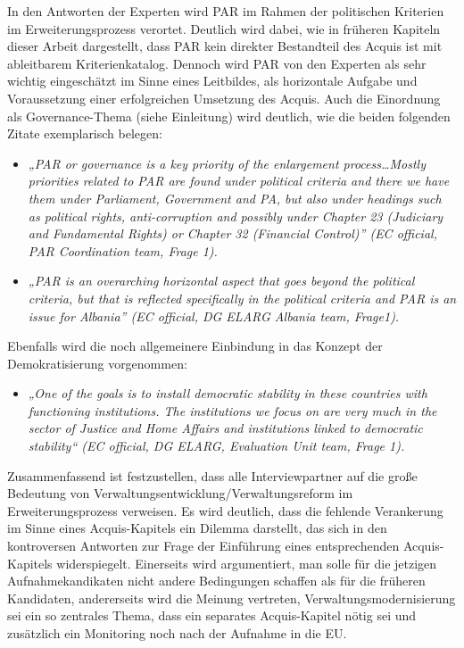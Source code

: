 In den Antworten der Experten wird PAR im Rahmen der politischen Kriterien im Erweiterungsprozess verortet. Deutlich wird dabei, wie in früheren Kapiteln dieser Arbeit dargestellt, dass PAR kein direkter Bestandteil des Acquis ist mit ableitbarem Kriterienkatalog. Dennoch wird PAR von den Experten als sehr wichtig eingeschätzt im Sinne eines Leitbildes, als horizontale Aufgabe und Voraussetzung einer erfolgreichen Umsetzung des Acquis. Auch die Einordnung als Governance-Thema (siehe Einleitung) wird deutlich, wie die beiden folgenden Zitate exemplarisch belegen: 

\begin{itemize}[label={}]
\item \textit{„PAR or governance is a key priority of the enlargement process…Mostly priorities related to PAR are found under political criteria and there we have them under Parliament, Government and PA, but also under headings such as political rights, anti-corruption and possibly under Chapter 23 (Judiciary and Fundamental Rights) or Chapter 32 (Financial Control)” (EC official, PAR Coordination team, Frage 1).}
\item \textit{„PAR is an overarching horizontal aspect that goes beyond the political criteria, but that is reflected specifically in the political criteria and PAR is an issue for Albania” (EC official, DG ELARG Albania team, Frage1).}
\end{itemize}

Ebenfalls wird die noch allgemeinere Einbindung in das Konzept der Demokratisierung vorgenommen:
\begin{itemize}[label={}]
\item \textit{„One of the goals is to install democratic stability in these countries with functioning institutions. The institutions we focus on are very much in the sector of Justice and Home Affairs and institutions linked to democratic stability“ (EC official, DG ELARG, Evaluation Unit team, Frage 1).}
\end{itemize}

Zusammenfassend ist festzustellen, dass alle Interviewpartner auf die große Bedeutung von Verwaltungsentwicklung/Verwaltungsreform im Erweiterungsprozess verweisen. Es wird deutlich, dass die fehlende Verankerung im Sinne eines Acquis-Kapitels ein Dilemma darstellt, das sich in den kontroversen Antworten zur Frage der Einführung eines entsprechenden Acquis-Kapitels widerspiegelt. Einerseits wird argumentiert, man solle für die jetzigen Aufnahmekandikaten nicht andere Bedingungen schaffen als für die früheren Kandidaten, andererseits wird die Meinung vertreten, Verwaltungsmodernisierung sei ein so zentrales Thema, dass ein separates Acquis-Kapitel nötig sei und zusätzlich ein Monitoring noch nach der Aufnahme in die EU.

